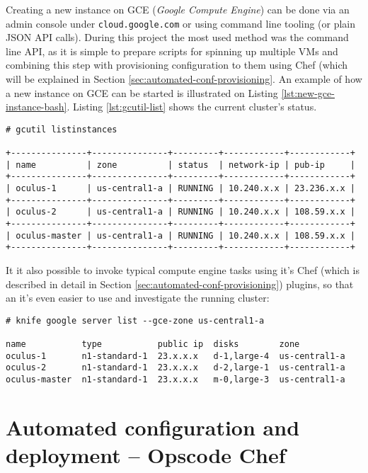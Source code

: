 Creating a new instance on GCE (\textit{Google Compute Engine}) can be done via an admin console under \verb|cloud.google.com| or using command line tooling (or plain JSON API calls). During this project the most used method was the command line API, as it is simple to prepare scripts for spinning up multiple VMs and combining this step with provisioning configuration to them using Chef (which will be explained in Section \ref{sec:automated-conf-provisioning}. An example of how a new instance on GCE can be started is illustrated on Listing \ref{lst:new-gce-instance-bash}. Listing \ref{lst:gcutil-list} shows the current cluster's status.

\label{lst:gcutil-list}
\begin{verbatim}
# gcutil listinstances

+---------------+---------------+---------+------------+------------+
| name          | zone          | status  | network-ip | pub-ip     |
+---------------+---------------+---------+------------+------------+
| oculus-1      | us-central1-a | RUNNING | 10.240.x.x | 23.236.x.x |
+---------------+---------------+---------+------------+------------+
| oculus-2      | us-central1-a | RUNNING | 10.240.x.x | 108.59.x.x |
+---------------+---------------+---------+------------+------------+
| oculus-master | us-central1-a | RUNNING | 10.240.x.x | 108.59.x.x |
+---------------+---------------+---------+------------+------------+
\end{verbatim}

It it also possible to invoke typical compute engine tasks using it's Chef (which is described in detail in Section \ref{sec:automated-conf-provisioning}) plugins, so that an it's even easier to use and investigate the running cluster:

\begin{verbatim}
# knife google server list --gce-zone us-central1-a

name           type           public ip  disks        zone           
oculus-1       n1-standard-1  23.x.x.x   d-1,large-4  us-central1-a  
oculus-2       n1-standard-1  23.x.x.x   d-2,large-1  us-central1-a  
oculus-master  n1-standard-1  23.x.x.x   m-0,large-3  us-central1-a  
\end{verbatim}


\label{sec:automated-conf-provisioning}
\section{Automated configuration and deployment -- Opscode Chef}

